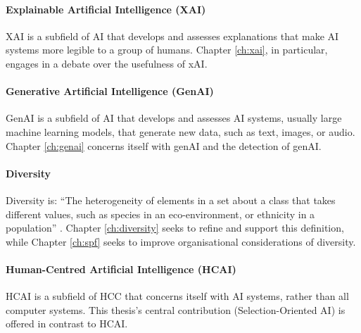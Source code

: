 \paragraph{Explainable Artificial Intelligence (XAI)}
XAI is a subfield of AI that develops and assesses explanations that make AI systems more legible to a group of humans. Chapter \ref{ch:xai}, in particular, engages in a debate over the usefulness of xAI.

\paragraph{Generative Artificial Intelligence (GenAI)}
GenAI is a subfield of AI that develops and assesses AI systems, usually large machine learning models, that generate new data, such as text, images, or audio. Chapter \ref{ch:genai} concerns itself with genAI and the detection of genAI.


\paragraph{Diversity}
Diversity is: ``The heterogeneity of elements in a set about a class that takes different values, such as species in an eco-environment, or ethnicity in a population'' \cite{page_diversity_2010}. Chapter \ref{ch:diversity} seeks to refine and support this definition, while Chapter \ref{ch:spf} seeks to improve organisational considerations of diversity.

\paragraph{Human-Centred Artificial Intelligence (HCAI)}
HCAI is a subfield of HCC that concerns itself with AI systems, rather than all computer systems. This thesis's central contribution (Selection-Oriented AI) is offered in contrast to HCAI.

